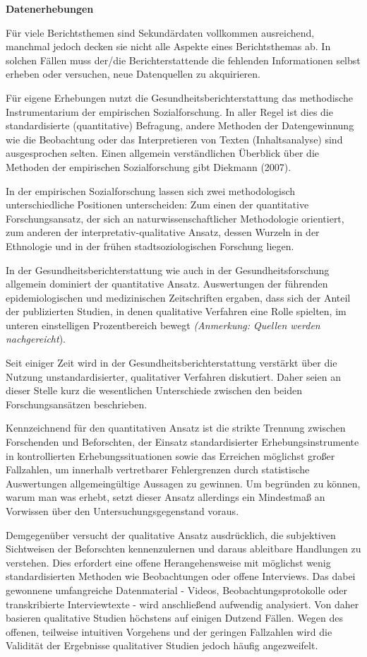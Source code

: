 \documentclass{article}
\begin{document}
\textbf{Datenerhebungen}


Für viele Berichtsthemen sind Sekundärdaten vollkommen ausreichend, manchmal jedoch decken sie nicht alle Aspekte eines Berichtsthemas ab. In solchen Fällen muss der/die Berichterstattende die fehlenden Informationen selbst erheben oder versuchen, neue Datenquellen zu akquirieren. 


Für eigene Erhebungen nutzt die Gesundheitsberichterstattung das methodische Instrumentarium der empirischen Sozialforschung. In aller Regel ist dies die standardisierte (quantitative) Befragung, andere Methoden der Datengewinnung wie die Beobachtung oder das Interpretieren von Texten (Inhaltsanalyse) sind ausgesprochen selten. Einen allgemein verständlichen Überblick über die Methoden der empirischen Sozialforschung gibt Diekmann (2007). 


In der empirischen Sozialforschung lassen sich zwei methodologisch unterschiedliche Positionen unterscheiden: Zum einen der quantitative Forschungsansatz, der sich an naturwissenschaftlicher Methodologie orientiert, zum anderen der interpretativ-qualitative Ansatz, dessen Wurzeln in der Ethnologie und in der frühen stadtsoziologischen Forschung liegen. 


In der Gesundheitsberichterstattung wie auch in der Gesundheitsforschung allgemein dominiert der quantitative Ansatz. Auswertungen der führenden epidemiologischen und medizinischen Zeitschriften ergaben, dass sich der Anteil der publizierten Studien, in denen qualitative Verfahren eine Rolle spielten, im unteren einstelligen Prozentbereich bewegt \emph{(Anmerkung: Quellen werden nachgereicht}). 


Seit einiger Zeit wird in der Gesundheitsberichterstattung verstärkt über die Nutzung unstandardisierter, qualitativer Verfahren diskutiert. Daher seien an dieser Stelle kurz die wesentlichen Unterschiede zwischen den beiden Forschungsansätzen beschrieben. 


Kennzeichnend für den quantitativen Ansatz ist die strikte Trennung zwischen Forschenden und Beforschten, der Einsatz standardisierter Erhebungsinstrumente in kontrollierten Erhebungssituationen sowie das Erreichen möglichst großer Fallzahlen, um innerhalb vertretbarer Fehlergrenzen durch statistische Auswertungen allgemeingültige Aussagen zu gewinnen. Um begründen zu können, warum man was erhebt, setzt dieser Ansatz allerdings ein Mindestmaß an Vorwissen über den Untersuchungsgegenstand voraus.


Demgegenüber versucht der qualitative Ansatz ausdrücklich, die subjektiven Sichtweisen der Beforschten kennenzulernen und daraus ableitbare Handlungen zu verstehen. Dies erfordert eine offene Herangehensweise mit möglichst wenig standardisierten Methoden wie Beobachtungen oder offene Interviews. Das dabei gewonnene umfangreiche Datenmaterial -  Videos, Beobachtungsprotokolle oder transkribierte Interviewtexte - wird anschließend aufwendig analysiert. Von daher basieren qualitative Studien höchstens auf einigen Dutzend Fällen. Wegen des offenen, teilweise  intuitiven Vorgehens und der geringen Fallzahlen wird die Validität der Ergebnisse qualitativer Studien jedoch häufig angezweifelt. 
\end{document}
